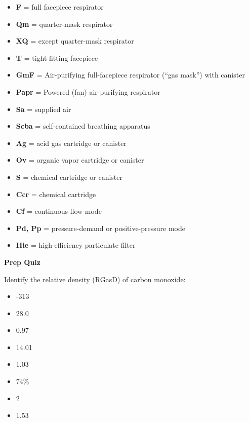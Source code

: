 \begin{itemize}
\item{} {\bf F} = full facepiece respirator
\item{} {\bf Qm} = quarter-mask respirator
\item{} {\bf XQ} = except quarter-mask respirator
\item{} {\bf T} = tight-fitting facepiece
\item{} {\bf GmF} = Air-purifying full-facepiece respirator (``gas mask'') with canister
\item{} {\bf Papr} = Powered (fan) air-purifying respirator
\item{} {\bf Sa} = supplied air
\item{} {\bf Scba} = self-contained breathing apparatus
\item{} {\bf Ag} = acid gas cartridge or canister
\item{} {\bf Ov} = organic vapor cartridge or canister
\item{} {\bf S} = chemical cartridge or canister
\item{} {\bf Ccr} = chemical cartridge
\item{} {\bf Cf} = continuous-flow mode
\item{} {\bf Pd, Pp} = pressure-demand or positive-pressure mode
\item{} {\bf Hie} = high-efficiency particulate filter
\end{itemize}














\vfil \eject

\noindent
{\bf Prep Quiz}

Identify the relative density (RGasD) of carbon monoxide:

\begin{itemize}
\item{} -313
\vskip 5pt
\item{} 28.0
\vskip 5pt
\item{} 0.97
\vskip 5pt
\item{} 14.01
\vskip 5pt
\item{} 1.03
\vskip 5pt
\item{} 74\%
\vskip 5pt
\item{} 2
\vskip 5pt
\item{} 1.53
\end{itemize}





